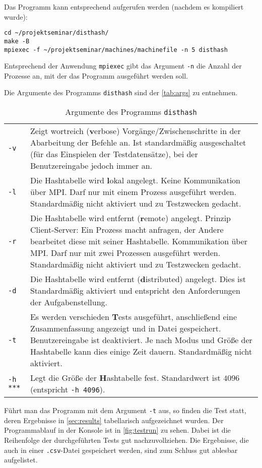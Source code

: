 \documentclass{scrreprt}
\begin{document}
Das Programm kann entsprechend aufgerufen werden (nachdem es kompiliert wurde):

\begin{lstlisting}
cd ~/projektseminar/disthash/
make -B
mpiexec -f ~/projektseminar/machines/machinefile -n 5 disthash
\end{lstlisting}

Entsprechend der Anwendung \lstinline`mpiexec` gibt das Argument \lstinline`-n` die Anzahl der Prozesse an, mit der das Programm ausgeführt werden soll.

Die Argumente des Programms \lstinline`disthash` sind der \autoref{tab:args} zu entnehmen.
\begin{table}[!ht]
\centering
\begin{tabular}{L{0.1} L{0.8}}
\lstinline`-v` & Zeigt wortreich (\textbf{v}erbose) Vorgänge/Zwischenschritte in der Abarbeitung der Befehle an. Ist standardmäßig ausgeschaltet (für das Einspielen der Testdatensätze), bei der Benutzereingabe jedoch immer an.\\
\lstinline`-l` & Die Hashtabelle wird \textbf{l}okal angelegt. Keine Kommunikation über MPI. Darf nur mit einem Prozess ausgeführt werden. Standardmäßig nicht aktiviert und zu Testzwecken gedacht.\\
\lstinline`-r` & Die Hashtabelle wird entfernt (\textbf{r}emote) angelegt. Prinzip Client-Server: Ein Prozess macht anfragen, der Andere bearbeitet diese mit seiner Hashtabelle. Kommunikation über MPI. Darf nur mit zwei Prozessen ausgeführt werden. Standardmäßig nicht aktiviert und zu Testzwecken gedacht.\\
\lstinline`-d` & Die Hashtabelle wird entfernt (\textbf{d}istributed) angelegt. Dies ist Standardmäßig aktiviert und entspricht den Anforderungen der Aufgabenstellung.\\
\lstinline`-t` & Es werden verschieden \textbf{T}ests ausgeführt, anschließend eine Zusammenfassung angezeigt und in Datei gespeichert. Benutzereingabe ist deaktiviert. Je nach Modus und Größe der Hashtabelle kann dies einige Zeit dauern. Standardmäßig nicht aktiviert.\\
\lstinline`-h ***` & Legt die Größe der \textbf{H}ashtabelle fest. Standardwert ist $4096$ (entspricht \lstinline`-h 4096`).\\
\end{tabular}
\caption{Argumente des Programms \lstinline`disthash`}
\label{tab:args}
\end{table}

Führt man das Programm mit dem Argument \lstinline`-t` aus, so finden die Test statt, deren Ergebnisse in \ref{sec:results} tabellarisch aufgezeichnet wurden. Der Programmablauf in der Konsole ist in \autoref{fig:testrun} zu sehen. Dabei ist die Reihenfolge der durchgeführten Tests gut nachzuvollziehen. Die Ergebnisse, die auch in einer \lstinline`.csv`-Datei gespeichert werden, sind zum Schluss gut ablesbar aufgelistet.\bigskip
\end{document}
